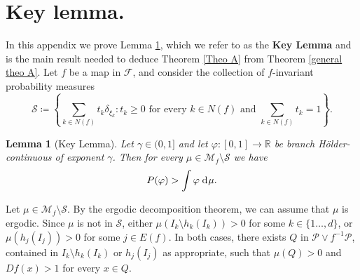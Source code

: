 \documentclass[12pt]{amsart}
\numberwithin{equation}{section} %
\numberwithin{figure}{section} %
\theoremstyle{plain}
\newtheorem{lemm}[prop]{Lemma}
\theoremstyle{definition}
\theoremstyle{remark}
\theoremstyle{citing}
\newcommand{\R}{\mathbb{R}}
\newcommand{\sF}{\mathscr{F}}
\renewcommand{\=}{\coloneqq}
\newcommand{\dd}{\hspace{1pt}\operatorname{d}\hspace{-1pt}}
\begin{document}
\appendix
\section{Key lemma.}\label{sec: key lemma}
In this appendix we prove Lemma \ref{key lemma}, which we refer to as the \textbf{Key Lemma} and is the main result needed to deduce Theorem \ref{Theo A} from Theorem \ref{general theo A}. Let $f$ be a map in $\sF$, and consider the collection of $f$-invariant probability measures
\begin{equation}
\mathcal{S}\=\left\{\sum_{k\in N(f)} t_k\delta_{\xi_k} : t_k\geq0 \text{ for every } k\in N(f) \text{ and } \sum_{k\in N(f)}t_k=1\right\}.
\end{equation}
\begin{lemm}[Key Lemma]\label{key lemma}
Let $\gamma\in(0,1]$ and let $\varphi:[0,1]\to\R$ be branch Hölder-continuous of exponent $\gamma$. Then for every $\mu\in \mathcal{M}_f \setminus\mathcal{S}$ we have
\begin{equation}\label{eq key lemma}
    P(\varphi)>\int \varphi \dd\mu.
\end{equation}
\end{lemm}
Let $\mu \in \mathcal{M}_f\setminus \mathcal{S}$. By the ergodic decomposition theorem, we can assume that $\mu$ is ergodic. Since $\mu$ is not in $\mathcal{S}$, either $\mu(I_k\setminus h_k(I_k))>0$ for some $k\in\{1\ldots,d\}$, or $\mu(h_j(I_j))>0$ for some $j\in E(f)$. In both cases, there exists $Q$ in $\mathcal{P}\vee f^{-1}\mathcal{P}$, contained in $I_k\setminus h_k(I_k)$ or $h_j(I_j)$ as appropriate, such that $\mu(Q)>0$ and $Df(x)>1$ for every $x\in Q$.
\end{document}
